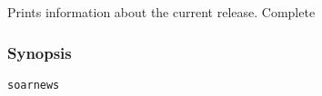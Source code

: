 \subsection{}
\label{soarnews}
Prints information about the current release. 
 Complete
\subsubsection*{Synopsis}
\begin{verbatim}
soarnews
\end{verbatim}
